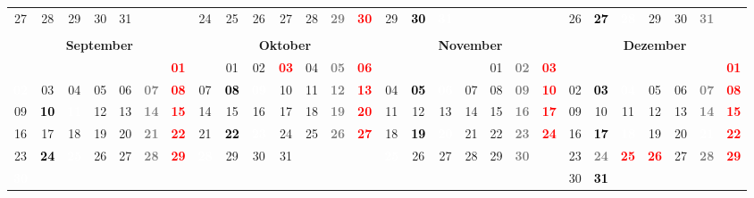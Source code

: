\documentclass[10pt,a4paper,landscape]{article}
\newcommand{\bb}[1]{\cellcolor{MidnightBlue}\textcolor{white}{\bf #1}}
\newcommand{\yb}[1]{\cellcolor{yellow}\textcolor{black}{\bf #1}}
\newcommand{\ob}[1]{\cellcolor{Orange}\textcolor{white}{\bf #1}}
\newcommand{\rb}[1]{\textbf{\textcolor{red}{#1}}}
\newcommand{\hv}[1]{\textbf{\textcolor{Gray}{#1}}}
\begin{document}
\begin{tabular}{|ccccccc|ccccccc|ccccccc|ccccccc|}
27 & 28 & 29 & 30 & 31 & & & 24 & 25 & 26 & 27 & 28 & \hv{29} & \rb{30} & 29 & \yb{30} & \ob{31} & & & & & 26 & \yb{27} & \ob{28} & 29 & 30 & \hv{31} &  \\
& & & & & & & & & & & & & & & & & & & & & & & & & & &  \\
\hline
\multicolumn{7}{|c|}{\bf September} & \multicolumn{7}{|c|}{\bf Oktober} & \multicolumn{7}{|c|}{\bf November} & \multicolumn{7}{|c|}{\bf Dezember} \\
& & & & & & \rb{01} & & 01 & 02 & \rb{03} & 04 & \hv{05} & \rb{06} & & & & & 01 & \hv{02} & \rb{03} & & & & & & & \rb{01} \\
\bb{02} & 03 & 04 & 05 & 06 & \hv{07} & \rb{08} & 07 & \yb{08} & \ob{09} & 10 & 11 & \hv{12} & \rb{13} & 04 & \yb{05} & \ob{06} & 07 & 08 & \hv{09} & \rb{10} & 02 & \yb{03} & \ob{04} & 05 & 06 & \hv{07} & \rb{08} \\
09 & \yb{10} & \ob{11} & 12 & 13 & \hv{14} & \rb{15} & 14 & 15 & 16 & 17 & 18 & \hv{19} & \rb{20} & 11 & 12 & 13 & 14 & 15 & \hv{16} & \rb{17} & 09 & 10 & 11 & 12 & 13 & \hv{14} & \rb{15} \\
16 & 17 & 18 & 19 & 20 & \hv{21} & \rb{22} & 21 & \yb{22} & \ob{23} & 24 & 25 & \hv{26} & \rb{27} & 18 & \yb{19} & \ob{20} & 21 & 22 & \hv{23} & \rb{24} & 16 & \yb{17} & \ob{18} & 19 & 20 & \bb{21} & \rb{22} \\
23 & \yb{24} & \ob{25} & 26 & 27 & \hv{28} & \rb{29} & \bb{28} & 29 & 30 & 31 & & & & \bb{25} & 26 & 27 & 28 & 29 & \hv{30} & & 23 & \hv{24} & \rb{25} & \rb{26} & 27 & \hv{28} & \rb{29} \\
\bb{30} & & & & & & & & & & & & & & & & & & & & & 30 & \yb{31} & & & & &  \\
\hline
\end{tabular}
\end{document}
